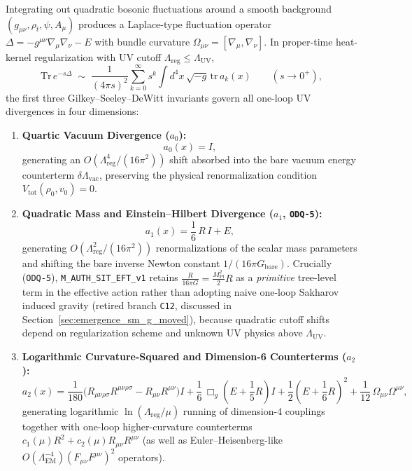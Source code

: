 Integrating out quadratic bosonic fluctuations around a smooth background $(g_{\mu\nu}, \rho_t, \psi, A_\mu)$ produces a Laplace-type fluctuation operator $\Delta = -g^{\mu\nu}\nabla_\mu\nabla_\nu - E$ with bundle curvature $\Omega_{\mu\nu} = [\nabla_\mu, \nabla_\nu]$. In proper-time heat-kernel regularization with UV cutoff $\Lambda_{\mathrm{reg}} \le \Lambda_{\mathrm{UV}}$,
\begin{equation}
\mathrm{Tr}\,e^{-s\Delta}
\;\sim\;
\frac{1}{(4\pi s)^2}\sum_{k=0}^\infty s^k \int d^4x\,\sqrt{-g}\,\mathrm{tr}\,a_k(x)
\qquad (s \to 0^+),
\label{eq:heat_kernel_asymptotic}
\end{equation}
the first three Gilkey--Seeley--DeWitt invariants govern all one-loop UV divergences in four dimensions:
\begin{enumerate}[leftmargin=2em]
  \item \textbf{Quartic Vacuum Divergence ($a_0$):}
  \begin{equation}
  a_0(x) = I,
  \end{equation}
  generating an $O(\Lambda_{\mathrm{reg}}^4 / (16\pi^2))$ shift absorbed into the bare vacuum energy counterterm $\delta\Lambda_{\mathrm{vac}}$, preserving the physical renormalization condition $V_{\mathrm{tot}}(\rho_0, v_0) = 0$.
  \item \textbf{Quadratic Mass and Einstein--Hilbert Divergence ($a_1$, \texttt{ODQ-5}):}
  \begin{equation}
  a_1(x) = \frac{1}{6}\,R\,I + E,
  \end{equation}
  generating $O(\Lambda_{\mathrm{reg}}^2/(16\pi^2))$ renormalizations of the scalar mass parameters and shifting the bare inverse Newton constant $1/(16\pi G_{\mathrm{bare}})$. Crucially (\texttt{ODQ-5}), \texttt{M\_AUTH\_SIT\_EFT\_v1} retains $\frac{R}{16\pi G} = \frac{M_{\mathrm{Pl}}^2}{2}R$ as a \emph{primitive} tree-level term in the effective action rather than adopting naive one-loop Sakharov induced gravity (retired branch \texttt{C12}, discussed in Section~\ref{sec:emergence_sm_g_moved}), because quadratic cutoff shifts depend on regularization scheme and unknown UV physics above $\Lambda_{\mathrm{UV}}$.
  \item \textbf{Logarithmic Curvature-Squared and Dimension-6 Counterterms ($a_2$):}
  \begin{equation}
  a_2(x)
  = \frac{1}{180}\bigl(R_{\mu\nu\rho\sigma}R^{\mu\nu\rho\sigma} - R_{\mu\nu}R^{\mu\nu}\bigr)I
    + \frac{1}{6}\,\Box_g\!\left(E + \frac{1}{5}R\right)I
    + \frac{1}{2}\left(E + \frac{1}{6}R\right)^2
    + \frac{1}{12}\,\Omega_{\mu\nu}\Omega^{\mu\nu},
  \label{eq:seeley_dewitt_a2}
  \end{equation}
  generating logarithmic $\ln(\Lambda_{\mathrm{reg}}/\mu)$ running of dimension-4 couplings together with one-loop higher-curvature counterterms $c_1(\mu)R^2 + c_2(\mu)R_{\mu\nu}R^{\mu\nu}$ (as well as Euler--Heisenberg-like $O(\Lambda_{\mathrm{EM}}^{-4})(F_{\mu\nu}F^{\mu\nu})^2$ operators).
\end{enumerate}

